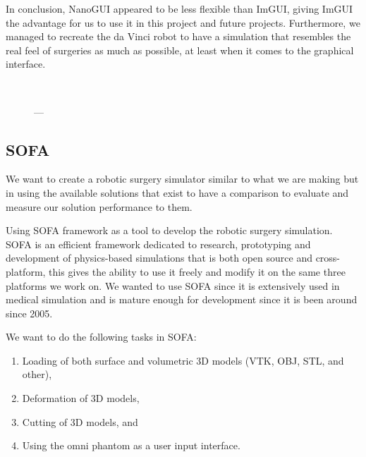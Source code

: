 \begin{center}
  \setlength{\fboxsep}{0pt}%
  \setlength{\fboxrule}{0.1pt}%
\end{center}

In conclusion, NanoGUI appeared to be less flexible than ImGUI, giving ImGUI the advantage for us to use it in this project and future projects. Furthermore, we managed to recreate the da Vinci robot  to have a simulation that resembles the real feel of surgeries as much as possible, at least when it comes to the graphical interface.

\begin{figure}
  \centering%
  \setlength{\fboxsep}{0pt}%
  \setlength{\fboxrule}{0.1pt}%
  \\[1ex]
  \caption{---}\label{fig:}
\end{figure}



\subsection{SOFA}\label{sec:sofa}
We want to create a robotic surgery simulator similar to what we are making but in using the available solutions that exist to have a comparison to evaluate and measure our solution performance to them.

Using SOFA framework as a tool to develop the robotic surgery simulation. SOFA is an efficient framework dedicated to research, prototyping and development of physics-based simulations that is both open source and cross-platform, this gives the ability to use it freely and modify it on the same three platforms we work on. We wanted to use SOFA since it is extensively used in medical simulation and is mature enough for development since it is been around since 2005.

We want to do the following tasks in SOFA:
\begin{enumerate}[1.]
  \item Loading of both surface and volumetric 3D models (VTK, OBJ, STL, and other),
  \item Deformation of 3D models,
  \item Cutting of 3D models, and
  \item Using the omni phantom as a user input interface.
\end{enumerate}

